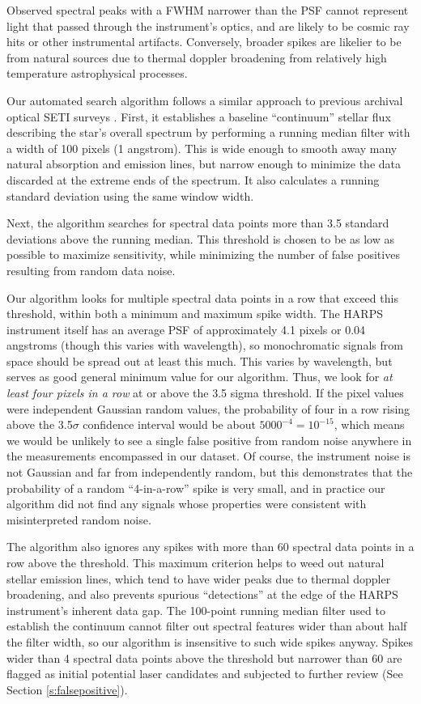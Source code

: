 \documentclass[twocolumn]{aastex701}
\begin{document}
Observed spectral peaks with a FWHM narrower than the PSF cannot represent light that passed through the instrument's optics, and are likely to be cosmic ray hits or other instrumental artifacts. Conversely, broader spikes are likelier to be from natural sources due to thermal doppler broadening from relatively high temperature astrophysical processes.

Our automated search algorithm follows a similar approach to previous archival optical SETI surveys \citep{Tellis_2017,Lipman_2019,Marcy_2021}. First, it establishes a baseline ``continuum'' stellar flux describing the star's overall spectrum by performing a running median filter with a width of 100 pixels (1 angstrom).  This is wide enough to smooth away many natural absorption and emission lines, but narrow enough to minimize the data discarded at the extreme ends of the spectrum.  It also calculates a running standard deviation using the same window width.

Next, the algorithm searches for spectral data points more than 3.5 standard deviations above the running median.  This threshold is chosen to be as low as possible to maximize sensitivity, while minimizing the number of false positives resulting from random data noise.  

Our algorithm looks for multiple spectral data points in a row that exceed this threshold, within both a minimum and maximum spike width.  The HARPS instrument itself has an average PSF of approximately 4.1 pixels \citep{HARPS_specs} or 0.04 angstroms (though this varies with wavelength), so monochromatic signals from space should be spread out at least this much. This varies by wavelength, but serves as good general minimum value for our algorithm. Thus, we look for \emph{at least four pixels in a row} at or above the 3.5 sigma threshold.  If the pixel values were independent Gaussian random values, the probability of four in a row rising above the 3.5$\sigma$ confidence interval would be about $5000^{-4}=10^{-15}$, which means we would be unlikely to see a single false positive from random noise anywhere in the measurements encompassed in our dataset. Of course, the instrument noise is not Gaussian and far from independently random, but this demonstrates that the probability of a random ``4-in-a-row'' spike is very small, and in practice our algorithm did not find any signals whose properties were consistent with misinterpreted random noise.

The algorithm also ignores any spikes with more than 60 spectral data points in a row above the threshold.  This maximum criterion helps to weed out natural stellar emission lines, which tend to have wider peaks due to thermal doppler broadening, and also prevents spurious ``detections'' at the edge of the HARPS instrument's inherent data gap. The 100-point running median filter used to establish the continuum cannot filter out spectral features wider than about half the filter width, so our algorithm is insensitive to such wide spikes anyway.  Spikes wider than 4 spectral data points above the threshold but narrower than 60 are flagged as initial potential laser candidates and subjected to further review (See Section \ref{s:falsepositive}).
\end{document}
